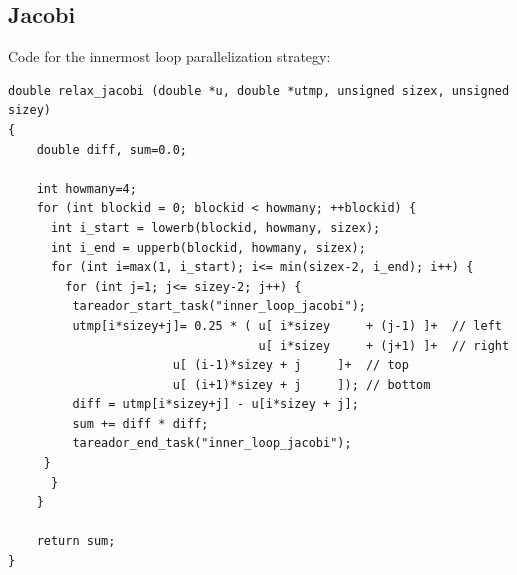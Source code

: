 \documentclass[12]{article}
\begin{document}
\subsection{Jacobi}
Code for the innermost loop parallelization strategy:
\medskip

\begin{lstlisting}[frame=single]
double relax_jacobi (double *u, double *utmp, unsigned sizex, unsigned sizey)
{
    double diff, sum=0.0;
  
    int howmany=4;
    for (int blockid = 0; blockid < howmany; ++blockid) {
      int i_start = lowerb(blockid, howmany, sizex);
      int i_end = upperb(blockid, howmany, sizex);
      for (int i=max(1, i_start); i<= min(sizex-2, i_end); i++) {
        for (int j=1; j<= sizey-2; j++) {
	     tareador_start_task("inner_loop_jacobi");
	     utmp[i*sizey+j]= 0.25 * ( u[ i*sizey     + (j-1) ]+  // left
	                               u[ i*sizey     + (j+1) ]+  // right
				       u[ (i-1)*sizey + j     ]+  // top
				       u[ (i+1)*sizey + j     ]); // bottom
	     diff = utmp[i*sizey+j] - u[i*sizey + j];
	     sum += diff * diff; 
	     tareador_end_task("inner_loop_jacobi");
	 }
      }
    }

    return sum;
}
\end{lstlisting}
\end{document}

